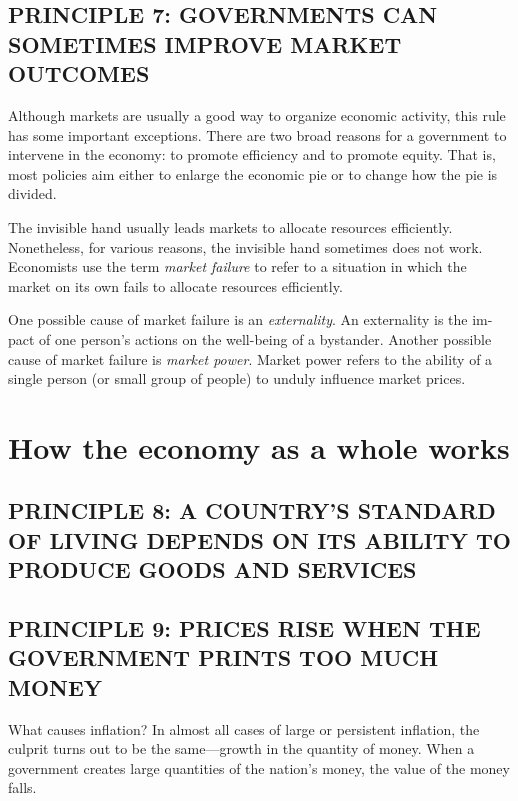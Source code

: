 \subsection*{PRINCIPLE 7: GOVERNMENTS CAN SOMETIMES IMPROVE MARKET OUTCOMES}

Although markets are usually a good way to organize economic activity, this rule has some important exceptions.
There are two broad reasons for a government to intervene in the economy: to promote efficiency and to promote equity.
That is, most policies aim either to enlarge the economic pie or to change how the pie is divided.



The invisible hand usually leads markets to allocate resources efficiently.
Nonetheless, for various reasons, the invisible hand sometimes does not work.
Economists use the term \emph{market failure} to refer to a situation in which the market on its own fails to allocate resources efficiently.



One possible cause of market failure is an \emph{externality}.
An externality is the im- pact of one person’s actions on the well-being of a bystander.
Another possible cause of market failure is \emph{market power}.
Market power refers to the ability of a single person (or small group of people) to unduly influence market prices.


\section{How the economy as a whole works}

\subsection*{PRINCIPLE 8: A COUNTRY’S STANDARD OF LIVING DEPENDS ON ITS ABILITY TO PRODUCE GOODS AND SERVICES}

\subsection*{PRINCIPLE 9: PRICES RISE WHEN THE GOVERNMENT PRINTS TOO MUCH MONEY}

What causes inflation? In almost all cases of large or persistent inflation, the culprit turns out to be the same—growth in the quantity of money.
When a government creates large quantities of the nation’s money, the value of the money falls.



